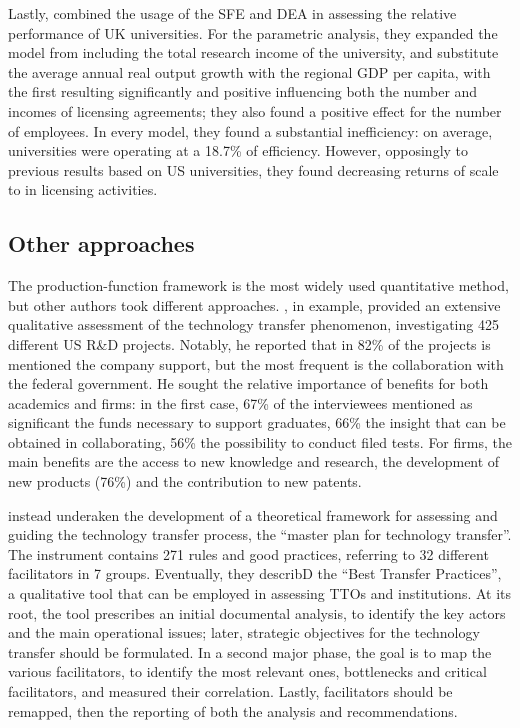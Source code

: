 Lastly, \citet{Chapple2005} combined the usage of the SFE and DEA in assessing the relative performance of UK universities. For the parametric analysis, they expanded the model from \citet{Siegel2003a} including the total research income of the university, and substitute the average annual real output growth with the regional GDP per capita, with the first resulting significantly and positive influencing both the number and incomes of licensing agreements; they also found a positive effect for the number of employees. In every model, they found a substantial inefficiency: on average, universities were operating at a 18.7\% of efficiency. However, opposingly to previous results based on US universities, they found decreasing returns of scale to in licensing activities.

\subsection{Other approaches}

The production-function framework is the most widely used quantitative method, but other authors took different approaches. \citet{Lee2000}, in example, provided an extensive qualitative assessment of the technology transfer phenomenon, investigating 425 different US R\&D projects. Notably, he reported that in 82\% of the projects is mentioned the company support, but the most frequent is the collaboration with the federal government. He sought the relative importance of benefits for both academics and firms: in the first case, 67\% of the interviewees mentioned as significant the funds necessary to support graduates, 66\% the insight that can be obtained in collaborating, 56\% the possibility to conduct filed tests. For firms, the main benefits are the access to new knowledge and research, the development of new products (76\%) and the contribution to new patents.

\citet{Resende2013} instead underaken the development of a theoretical framework for assessing and guiding the technology transfer process, the \enquote{master plan for technology transfer}. The instrument contains 271 rules and good practices, referring to 32 different facilitators in 7 groups. Eventually, they describD the \enquote{Best Transfer Practices}, a qualitative tool that can be employed in assessing TTOs and institutions. At its root, the tool prescribes an initial documental analysis, to identify the key actors and the main operational issues; later, strategic objectives for the technology transfer should be formulated. In a second major phase, the goal is to map the various facilitators, to identify the most relevant ones, bottlenecks and critical facilitators, and measured their correlation. Lastly, facilitators should be remapped, then the reporting of both the analysis and recommendations. 

